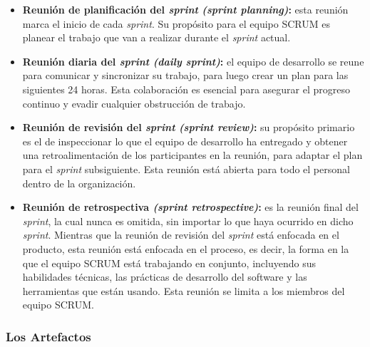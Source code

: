 			\begin{itemize}
				\item \textbf{Reuni\'{o}n de planificaci\'{o}n del \textit{sprint} \textit{(sprint planning)}: }
				esta reuni\'{o}n marca el inicio de cada \textit{sprint}. Su prop\'{o}sito para el equipo SCRUM es planear el trabajo que van a realizar durante el \textit{sprint} actual.
				
				\item \textbf{Reuni\'{o}n diaria del \textit{sprint} \textit{(daily sprint)}: }
				el equipo de desarrollo se reune para comunicar y sincronizar su trabajo, para luego crear un plan para las siguientes 24 horas. Esta colaboraci\'{o}n es esencial para asegurar el progreso continuo y evadir cualquier obstrucci\'{o}n de trabajo.
				
				\item \textbf{Reuni\'{o}n de revisi\'{o}n del \textit{sprint} \textit{(sprint review)}: }
				su prop\'{o}sito primario es el de inspeccionar lo que el equipo de desarrollo ha entregado y obtener una retroalimentaci\'{o}n de los participantes en la reuni\'{o}n, para adaptar el plan para el \textit{sprint} subsiguiente. Esta reuni\'{o}n est\'{a} abierta para todo el personal dentro de la organizaci\'{o}n.
				
				\item \textbf{Reuni\'{o}n de retrospectiva \textit{(sprint retrospective)}: }
				es la reuni\'{o}n final del \textit{sprint}, la cual nunca es omitida, sin importar lo que haya ocurrido en dicho \textit{sprint}. Mientras que la reuni\'{o}n de revisi\'{o}n del \textit{sprint} est\'{a} enfocada en el producto, esta reuni\'{o}n est\'{a} enfocada en el proceso, es decir, la forma en la que el equipo SCRUM est\'{a} trabajando en conjunto, incluyendo sus habilidades t\'{e}cnicas, las pr\'{a}cticas de desarrollo del software y las herramientas que est\'{a}n usando. Esta reuni\'{o}n se limita a los miembros del equipo SCRUM.
				
			\end{itemize}
			
		\subsubsection{Los Artefactos}
			
